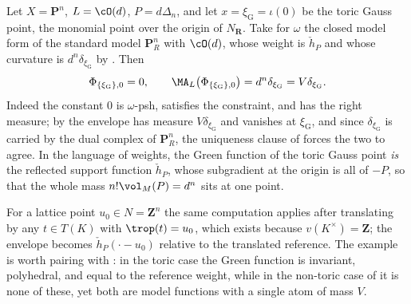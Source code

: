 \begin{example}
\label{ex:ch31-toric-green}
Let \(X=\mathbf P^n\), \(L=\cO(d)\), \(P=d\Delta_n\), and let
\(x=\xi_{\mathrm G}=\iota(0)\) be the toric Gauss point, the monomial point
over the origin of \(N_{\mathbf R}\).  Take for \(\omega\) the closed model
form of the standard model \(\mathbf P^n_R\) with \(\cO(d)\), whose weight
is \(\check h_P\) and whose curvature is \(d^n\delta_{\xi_{\mathrm G}}\) by
.  Then
\begin{equation}
\label{eq:ch31-toric-green}
 \Phi_{\{\xi_{\mathrm G}\},0}=0,
 \qquad
 \MA_L\bigl(\Phi_{\{\xi_{\mathrm G}\},0}\bigr)
  =d^n\delta_{\xi_{\mathrm G}}=V\delta_{\xi_{\mathrm G}} .
\end{equation}
Indeed the constant \(0\) is \(\omega\)-psh, satisfies the constraint, and
has the right measure; by  the envelope has measure
\(V\delta_{\xi_{\mathrm G}}\) and vanishes at \(\xi_{\mathrm G}\), and since
\(\delta_{\xi_{\mathrm G}}\) is carried by the dual complex of
\(\mathbf P^n_R\), the uniqueness clause of 
forces the two to agree.  In the language of weights, the Green function of
the toric Gauss point \emph{is} the reflected support function
\(\check h_P\), whose subgradient at the origin is all of \(-P\), so that
the whole mass \(n!\vol_M(P)=d^n\) sits at one point.

For a lattice point \(u_0\in N=\mathbf Z^n\) the same computation applies
after translating by any \(t\in T(K)\) with \(\trop(t)=u_0\), which exists
because \(v(K^\times)=\mathbf Z\); the envelope becomes
\(\check h_P(\cdot-u_0)\) relative to the translated reference.  The example
is worth pairing with : in the toric case the Green
function is invariant, polyhedral, and equal to the reference weight, while
in the non-toric case of  it is none of these, yet
both are model functions with a single atom of mass \(V\).
\end{example}

